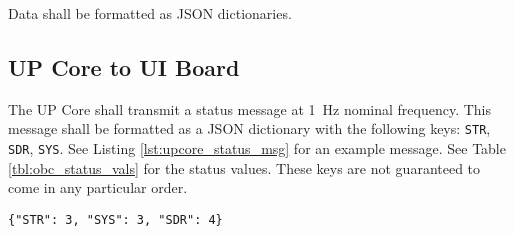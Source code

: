\documentclass{report}
\begin{document}
			Data shall be formatted as JSON dictionaries.

			\subsection{UP Core to UI Board}\label{ssec:obc_ui_msg}
				The UP Core shall transmit a status message at \SI{1}{\hertz} nominal frequency. This message shall be formatted as a JSON dictionary with the following keys: \lstinline{STR}, \lstinline{SDR}, \lstinline{SYS}.  See Listing \ref{lst:upcore_status_msg} for an example message.  See Table \ref{tbl:obc_status_vals} for the status values.  These keys are not guaranteed to come in any particular order.

				\begin{lstlisting}[caption={UP Core Status Message}, label={lst:upcore_status_msg}]
{"STR": 3, "SYS": 3, "SDR": 4}
				\end{lstlisting}
\end{document}
